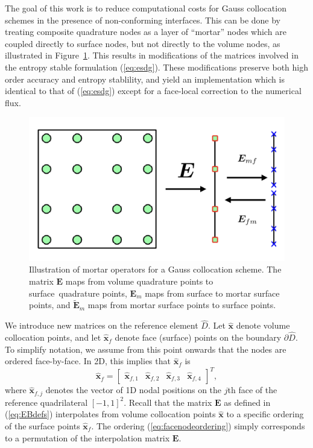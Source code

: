 \documentclass{svjour3}                     %
\renewcommand{\hat}{\widehat}
\renewcommand{\tilde}{\widetilde}
\renewcommand{\note}[1]{{\color{blue}{#1}}}
\begin{document}
The goal of this work is to reduce computational costs for Gauss collocation schemes in the presence of non-conforming interfaces.  This can be done by treating composite quadrature nodes as a layer of ``mortar'' nodes which are coupled directly to surface nodes, but not directly to the volume nodes, as illustrated in Figure~\ref{fig:gqcon_noncon}.  This results in modifications of the matrices involved in the entropy stable formulation (\ref{eq:esdg}).  These modifications preserve both high order accuracy and entropy stablility, and yield an implementation which is identical to that of (\ref{eq:esdg}) except for a face-local correction to the numerical flux.  
\begin{figure}
\centering
\includegraphics[width=.6\textwidth]{figs/mortar.png}
\caption{Illustration of mortar operators for a Gauss collocation scheme.  The matrix $\bm{E}$ maps from volume quadrature points to surface quadrature points, $\bm{E}_m$ maps from surface to mortar surface points, and $\tilde{\bm{E}}_m$ maps from mortar surface points to surface points.  \note{Fix notation after Mario standardizes it.}}
\label{fig:gqcon_noncon}
\end{figure}

We introduce new matrices on the reference element $\hat{D}$.  Let $\hat{\bm{x}}$ denote volume collocation points, and let $\hat{\bm{x}}_f$ denote face (surface) points on the boundary $\partial \hat{D}$.  To simplify notation, we assume from this point onwards that the nodes are ordered face-by-face.  In 2D, this implies that $\hat{\bm{x}}_f$ is 
\begin{equation}
\hat{\bm{x}}_f = \begin{bmatrix}
\hat{\bm{x}}_{f,1} &
\hat{\bm{x}}_{f,2} &
\hat{\bm{x}}_{f,3} &
\hat{\bm{x}}_{f,4}
\end{bmatrix}^T,
\label{eq:facenodeordering}
\end{equation}
where $\hat{\bm{x}}_{f,j}$ denotes the vector of 1D nodal positions on the $j$th face of the reference quadrilateral $[-1,1]^2$.  Recall that the matrix $\bm{E}$ as defined in (\ref{eq:EBdefs}) interpolates from volume collocation points $\hat{\bm{x}}$ to a specific ordering of the surface points $\hat{\bm{x}}_f$.  The ordering (\ref{eq:facenodeordering}) simply corresponds to a permutation of the interpolation matrix $\bm{E}$.  
\end{document}
